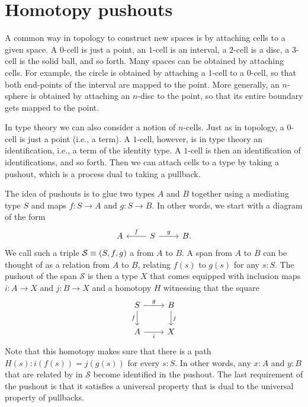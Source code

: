 \section{Homotopy pushouts}

A common way in topology to construct new spaces is by attaching cells to a given space. A $0$-cell is just a point, an $1$-cell is an interval, a $2$-cell is a disc, a $3$-cell is the solid ball, and so forth. Many spaces can be obtained by attaching cells. For example, the circle is obtained by attaching a $1$-cell to a $0$-cell, so that both end-points of the interval are mapped to the point. More generally, an $n$-sphere is obtained by attaching an $n$-disc to the point, so that its entire boundary gets mapped to the point.

In type theory we can also consider a notion of $n$-cells. Just as in topology, a $0$-cell is just a point (i.e., a term). A $1$-cell, however, is in type theory an identification, i.e., a term of the identity type. A $1$-cell is then an identification of identifications, and so forth. Then we can attach cells to a type by taking a pushout, which is a process dual to taking a pullback. 

The idea of pushouts is to glue two types $A$ and $B$ together using a mediating type $S$ and maps $f:S\to A$ and $g:S\to B$. In other words, we start with a diagram of the form
\begin{equation*}
\begin{tikzcd}
A & S \arrow[l,swap,"f"] \arrow[r,"g"] & B.
\end{tikzcd}
\end{equation*}
We call such a triple $\mathcal{S}\equiv (S,f,g)$ a  from $A$ to $B$.
A span from $A$ to $B$ can be thought of as a relation from $A$ to $B$, relating $f(s)$ to $g(s)$ for any $s:S$. The pushout of the span $\mathcal{S}$ is then a type $X$ that comes equipped with inclusion maps $i:A\to X$ and $j:B\to X$ and a homotopy $H$ witnessing that the square
\begin{equation*}
  \begin{tikzcd}
    S \arrow[d,swap,"f"] \arrow[r,"g"] & B \arrow[d,"j"] \\
    A \arrow[r,swap,"i"] & X
  \end{tikzcd}
\end{equation*}
Note that this homotopy makes sure that there is a path $H(s):i(f(s))=j(g(s))$ for every $s:S$. In other words, any $x:A$ and $y:B$ that are related by in $\mathcal{S}$ become identified in the pushout. The last requirement of the pushout is that it satisfies a universal property that is dual to the universal property of pullbacks.

